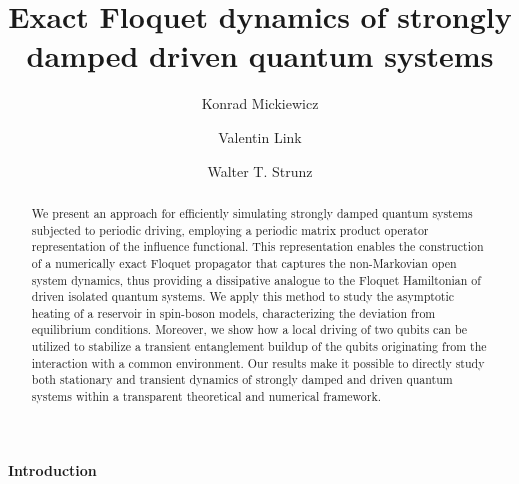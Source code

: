 \documentclass[aps,prb, twocolumn,superscriptaddress]{revtex4-2}
\begin{document}
\title{Exact Floquet dynamics of strongly damped driven quantum systems}

\author{Konrad Mickiewicz}

\author{Valentin Link}

\author{Walter T. Strunz}


\begin{abstract}
We present an approach for efficiently simulating strongly damped quantum systems subjected to periodic driving, employing a periodic matrix product operator representation of the influence functional. This representation enables the construction of a numerically exact Floquet propagator that captures the non-Markovian open system dynamics, thus providing a dissipative analogue to the Floquet Hamiltonian of driven isolated quantum systems. We apply this method to study the asymptotic heating of a reservoir in spin-boson models, characterizing the deviation from equilibrium conditions. Moreover, we show how a local driving of two qubits can be utilized to stabilize a transient entanglement buildup of the qubits originating from the interaction with a common environment. Our results make it possible to directly study both stationary and transient dynamics of strongly damped and driven quantum systems within a transparent theoretical and numerical framework.
\end{abstract}\maketitle

\paragraph*{Introduction}
\end{document}
